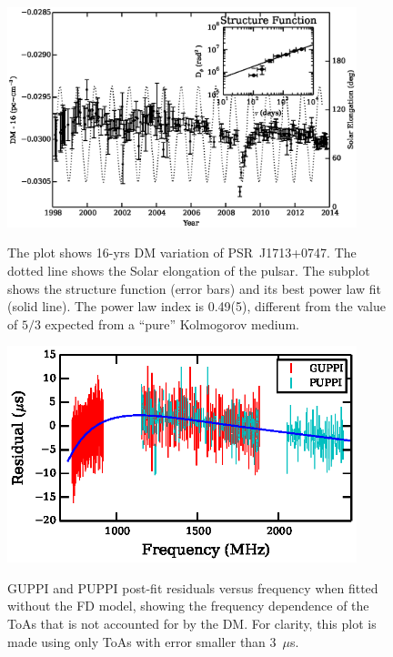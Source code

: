 \documentclass[iop,apj,tighten]{emulateapj}
\begin{document}
\begin{figure}
\includegraphics[width=4in]{DMX.ps} \\ 
\caption {\label{fig:dmx} The plot shows 16-yrs DM variation of PSR~J1713+0747. The dotted line shows the Solar
elongation of the pulsar. The subplot shows the structure function (error
bars) and its best power law fit (solid line). The power law index is
0.49(5), different from the value of $5/3$ expected from a
``pure'' Kolmogorov medium. } 
\end{figure} 


\begin{figure}
\includegraphics[width=4in]{FD.ps} \\ 
\caption {\label{fig:FD} GUPPI and PUPPI post-fit residuals versus frequency when fitted
without the FD model, showing the frequency dependence of the ToAs that is 
not accounted for by the DM. For
clarity, this plot is made using only ToAs with error smaller than 3~$\mu$s.} 
\end{figure} 
\end{document}
